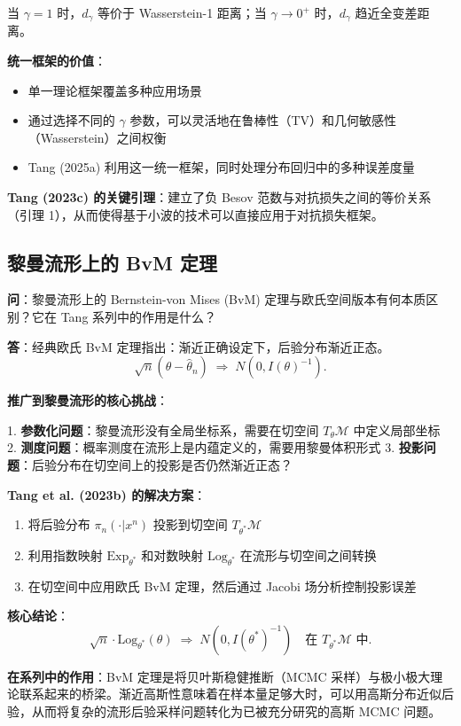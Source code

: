 当 $\gamma = 1$ 时，$d_\gamma$ 等价于 Wasserstein-1 距离；当 $\gamma \to 0^+$ 时，$d_\gamma$ 趋近全变差距离。

\textbf{统一框架的价值}：
\begin{itemize}
    \item 单一理论框架覆盖多种应用场景
    \item 通过选择不同的 $\gamma$ 参数，可以灵活地在鲁棒性（TV）和几何敏感性（Wasserstein）之间权衡
    \item Tang (2025a) 利用这一统一框架，同时处理分布回归中的多种误差度量
\end{itemize}

\textbf{Tang (2023c) 的关键引理}：建立了负 Besov 范数与对抗损失之间的等价关系（引理 1），从而使得基于小波的技术可以直接应用于对抗损失框架。

\subsection{黎曼流形上的 BvM 定理}\label{sec:qa-riemannian-bvm}

\textbf{问}：黎曼流形上的 Bernstein-von Mises (BvM) 定理与欧氏空间版本有何本质区别？它在 Tang 系列中的作用是什么？

\textbf{答}：经典欧氏 BvM 定理指出：渐近正确设定下，后验分布渐近正态。
\[
\sqrt{n}(\theta - \hat{\theta}_n) \;\Rightarrow\; N(0, I(\theta)^{-1}).
\]

\textbf{推广到黎曼流形的核心挑战}：

1. \textbf{参数化问题}：黎曼流形没有全局坐标系，需要在切空间 $T_\theta \mathcal{M}$ 中定义局部坐标
2. \textbf{测度问题}：概率测度在流形上是内蕴定义的，需要用黎曼体积形式
3. \textbf{投影问题}：后验分布在切空间上的投影是否仍然渐近正态？

\textbf{Tang et al. (2023b) 的解决方案}：
\begin{enumerate}
    \item 将后验分布 $\pi_n(\cdot|x^n)$ 投影到切空间 $T_{\theta^*}\mathcal{M}$
    \item 利用指数映射 $\text{Exp}_{\theta^*}$ 和对数映射 $\text{Log}_{\theta^*}$ 在流形与切空间之间转换
    \item 在切空间中应用欧氏 BvM 定理，然后通过 Jacobi 场分析控制投影误差
\end{enumerate}

\textbf{核心结论}：
\[
\sqrt{n} \cdot \text{Log}_{\theta^*}(\theta) \;\Rightarrow\; N(0, I(\theta^*)^{-1}) \quad \text{在 } T_{\theta^*}\mathcal{M} \text{ 中}.
\]

\textbf{在系列中的作用}：BvM 定理是将贝叶斯稳健推断（MCMC 采样）与极小极大理论联系起来的桥梁。渐近高斯性意味着在样本量足够大时，可以用高斯分布近似后验，从而将复杂的流形后验采样问题转化为已被充分研究的高斯 MCMC 问题。

